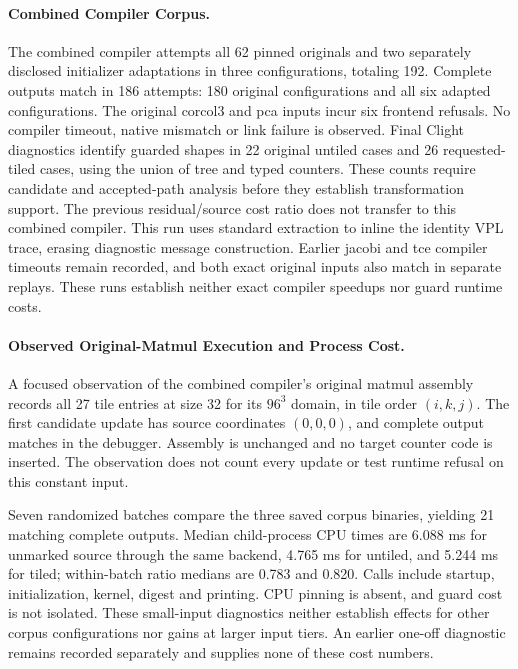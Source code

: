 \paragraph{Combined Compiler Corpus.}
The combined compiler attempts all 62 pinned originals and two separately
disclosed initializer adaptations in three configurations, totaling 192.
Complete outputs match in 186 attempts: 180 original configurations and all
six adapted configurations. The original corcol3 and pca inputs incur six
frontend refusals. No compiler timeout, native mismatch or link failure is
observed. Final Clight diagnostics
identify guarded shapes in 22 original untiled cases and 26 requested-tiled
cases, using the union of tree and typed counters. These counts require
candidate and accepted-path analysis before they establish transformation
support. The previous residual/source cost ratio does not transfer to this
combined compiler. This run uses standard extraction to inline the identity
VPL trace, erasing diagnostic message construction. Earlier jacobi and tce
compiler timeouts remain recorded, and both exact original inputs also match
in separate replays. These runs establish neither exact compiler speedups
nor guard runtime costs.

\paragraph{Observed Original-Matmul Execution and Process Cost.}
A focused observation of the combined compiler's original matmul assembly
records all 27 tile entries at size 32 for its $96^3$ domain, in tile order
$(i,k,j)$. The first candidate update has source coordinates $(0,0,0)$, and
complete output matches in the debugger. Assembly is unchanged and no target
counter code is inserted. The observation does not count every update or test
runtime refusal on this constant input.

Seven randomized batches compare the three saved corpus binaries, yielding 21
matching complete outputs. Median child-process CPU times are 6.088 ms for
unmarked source through the same backend, 4.765 ms for untiled, and 5.244 ms for
tiled; within-batch ratio medians are 0.783 and 0.820. Calls include startup,
initialization, kernel, digest and printing. CPU pinning is absent, and guard
cost is not isolated. These small-input diagnostics neither establish effects
for other corpus configurations nor gains at larger input tiers. An earlier
one-off diagnostic remains recorded separately and supplies none of these
cost numbers.

